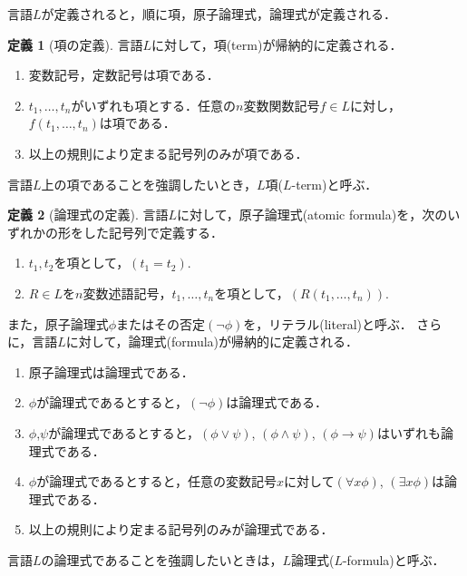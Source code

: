 \documentclass[uplatex, dvipdfmx]{jsarticle}
\numberwithin{equation}{section}
\theoremstyle{definition}
\newtheorem{definition}{定義}[section]
\begin{document}
言語$L$が定義されると，順に項，原子論理式，論理式が定義される．

\begin{definition}[項の定義]
     言語$L$に対して，項(term)が帰納的に定義される．
     \begin{enumerate}
          \item 変数記号，定数記号は項である．
          \item $t_1, \dots, t_n$がいずれも項とする．任意の$n$変数関数記号$f \in L$に対し，$f(t_1, \dots, t_n)$は項である．
          \item 以上の規則により定まる記号列のみが項である．
     \end{enumerate}
     言語$L$上の項であることを強調したいとき，$L$項($L$-term)と呼ぶ．
\end{definition}


\begin{definition}[論理式の定義]
     言語$L$に対して，原子論理式(atomic formula)を，次のいずれかの形をした記号列で定義する．
     \begin{enumerate}
          \item $t_1, t_2$を項として，$(t_1=t_2)$.
          \item $R \in L$を$n$変数述語記号，$t_1, \dots, t_n$を項として，$(R(t_1, \dots, t_n))$.
     \end{enumerate}
     
     また，原子論理式$\phi$またはその否定$(\lnot \phi)$を，リテラル(literal)と呼ぶ．
     さらに，言語$L$に対して，論理式(formula)が帰納的に定義される．
     \begin{enumerate}
          \item 原子論理式は論理式である．
          \item $\phi$が論理式であるとすると，$(\lnot \phi)$は論理式である．
          \item $\phi$,$\psi$が論理式であるとすると，$(\phi \lor \psi)$, $(\phi \land \psi)$, $(\phi \rightarrow \psi)$はいずれも論理式である．
          \item $\phi$が論理式であるとすると，任意の変数記号$x$に対して$(\forall x \phi)$, $(\exists x \phi)$は論理式である．
          \item 以上の規則により定まる記号列のみが論理式である．
     \end{enumerate}
     言語$L$の論理式であることを強調したいときは，$L$論理式($L$-formula)と呼ぶ．
\end{definition}
\end{document}
